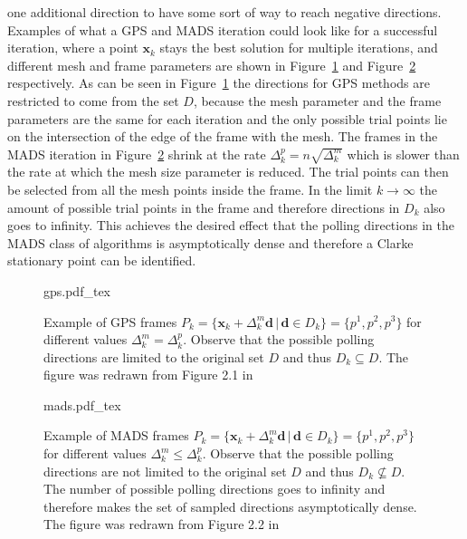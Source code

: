 \documentclass[a4paper,10pt]{article}
\renewcommand{\vec}[1]{\mathbf{#1}}
\newcommand{\figref}[1]{Figure~\ref{#1}}
\begin{document}
    one additional direction to have some sort of way to reach
    negative directions.
    Examples of what a GPS and MADS iteration could look like for
    a successful iteration, where a point $\vec{x}_k$ stays the
    best solution for multiple iterations, and
    different mesh and frame parameters are shown in \figref{fig:gps}
    and \figref{fig:mads} respectively.
    As can be seen in \figref{fig:gps} the directions for GPS methods
    are restricted to come from the set $D$, because the mesh parameter
    and the frame parameters are the same for each iteration and
    the only possible trial points lie on the intersection of the 
    edge of the frame with the mesh.
    The frames in the MADS iteration in \figref{fig:mads} shrink at the
    rate $\Delta^p_k = n \sqrt{\Delta^m_k}$ which is slower than
    the rate at which the mesh size parameter is reduced.
    The trial points can then be selected from all the mesh points
    inside the frame.
    In the limit $k \rightarrow \infty$ the amount of possible
    trial points in the frame and therefore directions in $D_k$
    also goes to infinity.
    This achieves the desired effect that the polling directions in
    the MADS class of algorithms is asymptotically dense and therefore
    a Clarke stationary point can be identified.

    \begin{figure}
    \centering
    {gps.pdf_tex}
    \caption[Example of GPS frames]{
    Example of GPS frames
    $P_k = \{\vec{x}_k + \Delta^m_k \vec{d} \, | \, \vec{d} \in D_k \}
    = \{p^1, p^2, p^3\}$ for different values $\Delta^m_k = \Delta^p_k$.
    Observe that the possible polling directions are limited to the
    original set $D$ and thus $D_k \subseteq D$.
    The figure was redrawn from Figure 2.1 in~\cite{mads_original}}
    \label{fig:gps}
    \end{figure}

    \begin{figure}
    \centering
    {mads.pdf_tex}
    \caption[Example of MADS frames]{
    Example of MADS frames
    $P_k = \{\vec{x}_k + \Delta^m_k \vec{d} \, | \, \vec{d} \in D_k \}
    = \{p^1, p^2, p^3\}$ for different values $\Delta^m_k \leq \Delta^p_k$.
    Observe that the possible polling directions are not limited to the
    original set $D$ and thus $D_k \nsubseteq D$. 
    The number of possible polling directions goes to infinity and
    therefore makes the set of sampled directions asymptotically dense.
    The figure was redrawn from Figure 2.2 in~\cite{mads_original}
    }
    \label{fig:mads}
    \end{figure}
\end{document}
